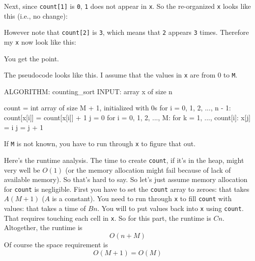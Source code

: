 Next, since \verb!count[1]! is \verb!0!, \verb!1! does not appear in 
\verb!x!.
So the re-organized \verb!x! looks like this (i.e., no change):


However note that \verb!count[2]! is \verb!3!, which means that
\verb!2! appears \verb!3! times.
Therefore my \verb!x! now look like this:


You get the point.

The pseudocode looks like this.
I assume that the values in \verb!x! are from 0 to \verb!M!.
\begin{console}
ALGORITHM: counting_sort
INPUT: array x of size n

    count = int array of size M + 1, initialized with 0s
    for i = 0, 1, 2, ..., n - 1:
        count[x[i]] = count[x[i]] + 1
    j = 0
    for i = 0, 1, 2, ..., M:
        for k = 1, ..., count[i]:
            x[j] = i
            j = j + 1
\end{console}

If \verb!M! is not 
known, you have to run through \verb!x! to figure that out.


Here's the runtime analysis.
The time to create \verb!count!, if it's in the heap,
might very well be $O(1)$ (or the memory allocation might fail because of lack of
available memory). So that's hard to say.
So let's just assume memory allocation for \verb!count! is negligible.
First you have to set the \verb!count! array to zeroes:
that takes $A(M + 1)$ ($A$ is a constant).
You need to run through \verb!x! to fill \verb!count! with
values: that takes a time of $Bn$.
You will to put values back into \verb!x! using \verb!count!.
That requires touching each cell in \verb!x!.
So for this part, the runtime is $Cn$.
Altogether, the runtime is
\[
O(n + M)
\]
Of course the space requirement is
\[
O(M + 1) = O(M)
\]

